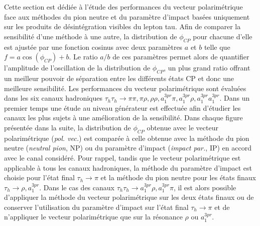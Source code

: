 Cette section est dédiée à l'étude des performances du vecteur polarimétrique face aux méthodes du pion neutre et du paramètre d'impact basées uniquement sur les produits de désintégration visibles du lepton tau. Afin de comparer la sensibilité d'une méthode à une autre, la distribution de $\phi_{CP}$ pour chacune d'elle est ajustée par une fonction cosinus avec deux paramètres $a$ et $b$ telle que $f = a\cos(\phi_{CP})+b$. Le ratio $a/b$ de ces paramètres permet alors de quantifier l'amplitude de l'oscillation de la distribution de $\phi_{CP}$, un plus grand ratio offrant un meilleur pouvoir de séparation entre les différents états CP et donc une meilleure sensibilité. Les performances du vecteur polarimétrique sont évaluées dans les six canaux hadroniques $\tau_h\tau_h\rightarrow\pi\pi,\pi\rho,\rho\rho,a_1^{3pr}\pi,a_1^{3pr}\rho,a_1^{3pr}a_1^{3pr}$. Dans un premier temps une étude au niveau générateur est effectuée afin d'étudier les canaux les plus sujets à une amélioration de la sensibilité. Dans chaque figure présentée dans la suite, la distribution de $\phi_{CP}$ obtenue avec le vecteur polarimétrique (\textit{pol. vec.}) est comparée à celle obtenue avec la méthode du pion neutre (\textit{neutral pion}, NP) ou du paramètre d'impact (\textit{impact par.}, IP) en accord avec le canal considéré. Pour rappel, tandis que le vecteur polarimétrique est applicable à tous les canaux hadroniques, la méthode du paramètre d'impact est choisie pour l'état final $\tau_h\rightarrow\pi$ et la méthode du pion neutre pour les états finaux $\tau_h\rightarrow\rho,a_1^{3pr}$. Dans le cas des canaux $\tau_h\tau_h\rightarrow a_1^{3pr}\rho,a_1^{3pr}\pi$, il est alors possible d'appliquer la méthode du vecteur polarimétrique sur les deux états finaux ou de conserver l'utilisation du paramètre d'impact sur l'état final $\tau_h\rightarrow\pi$ et de n'appliquer le vecteur polarimétrique que sur la résonance $\rho$ ou $a_1^{3pr}$. \\

